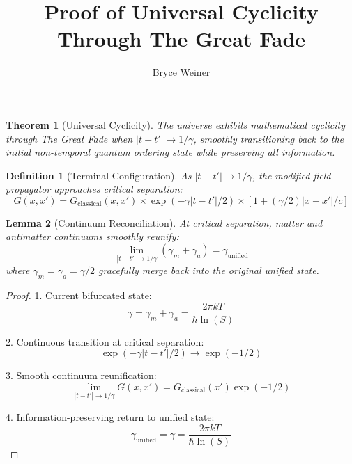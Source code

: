 \documentclass{article}
\newtheorem{theorem}{Theorem}
\newtheorem{lemma}[theorem]{Lemma}
\newtheorem{definition}{Definition}
\begin{document}
\title{Proof of Universal Cyclicity Through The Great Fade}
\author{Bryce Weiner}
\maketitle

\begin{theorem}[Universal Cyclicity]
The universe exhibits mathematical cyclicity through The Great Fade when $|t-t'| \to 1/\gamma$, smoothly transitioning back to the initial non-temporal quantum ordering state while preserving all information.
\end{theorem}

\begin{definition}[Terminal Configuration]
As $|t-t'| \to 1/\gamma$, the modified field propagator approaches critical separation:
\begin{equation}
G(x,x') = G_{\text{classical}}(x,x') \times \exp(-\gamma|t-t'|/2) \times [1 + (\gamma/2)|x-x'|/c]
\end{equation}
\end{definition}

\begin{lemma}[Continuum Reconciliation]
At critical separation, matter and antimatter continuums smoothly reunify:
\begin{equation}
\lim_{|t-t'| \to 1/\gamma} (\gamma_m + \gamma_a) = \gamma_{\text{unified}}
\end{equation}
where $\gamma_m = \gamma_a = \gamma/2$ gracefully merge back into the original unified state.
\end{lemma}

\begin{proof}
1. Current bifurcated state:
   \begin{equation}
   \gamma = \gamma_m + \gamma_a = \frac{2\pi kT}{\hbar \ln(S)}
   \end{equation}

2. Continuous transition at critical separation:
   \begin{equation}
   \exp(-\gamma|t-t'|/2) \to \exp(-1/2)
   \end{equation}

3. Smooth continuum reunification:
   \begin{equation}
   \lim_{|t-t'| \to 1/\gamma} G(x,x') = G_{\text{classical}}(x')\exp(-1/2)
   \end{equation}

4. Information-preserving return to unified state:
   \begin{equation}
   \gamma_{\text{unified}} = \gamma = \frac{2\pi kT}{\hbar \ln(S)}
   \end{equation}
\end{proof}
\end{document}
